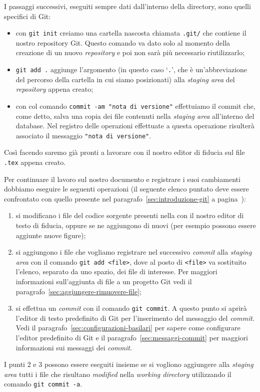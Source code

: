 \documentclass[a4paper,12pt,oneside]{article}
\begin{document}
I passaggi successivi, eseguiti sempre dati dall'interno della directory, sono
quelli specifici di Git:
\begin{itemize}
\item con \lstinline|git init| creiamo una cartella nascosta chiamata
  \lstinline|.git/| che contiene il nostro repository Git. Questo comando va
  dato solo al momento della creazione di un nuovo \emph{repository} e poi non
  sarà più necessario riutilizzarlo;
\item \lstinline|git add .| aggiunge l'argomento (in questo caso
  `\lstinline|.|', che è un'abbreviazione del percorso della cartella in cui
  siamo posizionati) alla \emph{staging area} del \emph{repository} appena
  creato;
\item con col comando \lstinline|commit -am "nota di versione"| effettuiamo il
  commit che, come detto, salva una copia dei file contenuti nella \emph{staging
    area} all'interno del database. Nel registro delle operazioni effettuate a
  questa operazione risulterà associato il messaggio \lstinline|"nota di versione"|.
\end{itemize}

Così facendo saremo già pronti a lavorare con il nostro editor di fiducia sul
file \lstinline|.tex| appena creato.

Per continuare il lavoro sul nostro documento e registrare i suoi cambiamenti
dobbiamo eseguire le seguenti operazioni (il seguente elenco puntato deve essere
confrontato con quello presente nel paragrafo~\ref{sec:introduzione-git} a
pagina~\pageref{list:lavoro-git}):
\begin{enumerate}
\item si modificano i file del codice sorgente presenti nella con il nostro
  editor di testo di fiducia, oppure se ne aggiungono di nuovi (per esempio
  possono essere aggiunte nuove figure);
\item si aggiungono i file che vogliamo registrare nel successivo \emph{commit}
  alla \emph{staging area} con il comando \lstinline|git add <file>|, dove al
  posto di \lstinline|<file>| va sostituito l'elenco, separato da uno spazio,
  dei file di interesse. Per maggiori informazioni sull'aggiunta di file a un
  progetto Git vedi il paragrafo~\ref{sec:aggiungere-rimuovere-file};
\item si effettua un \emph{commit} con il comando \lstinline|git commit|. A
  questo punto si aprirà l'editor di testo predefinito di Git per l'inserimento
  del messaggio del \emph{commit}. Vedi il
  paragrafo~\ref{sec:configurazioni-basilari} per sapere come configurare
  l'editor predefinito di Git e il paragrafo~\ref{sec:messaggi-commit} per
  maggiori informazioni sui messaggi dei \emph{commit}.
\end{enumerate}
I punti 2 e 3 possono essere eseguiti insieme se si vogliono aggiungere alla
\emph{staging area} tutti i file che risultano \emph{modified} nella
\emph{working directory} utilizzando il comando \lstinline|git commit -a|.
\end{document}
